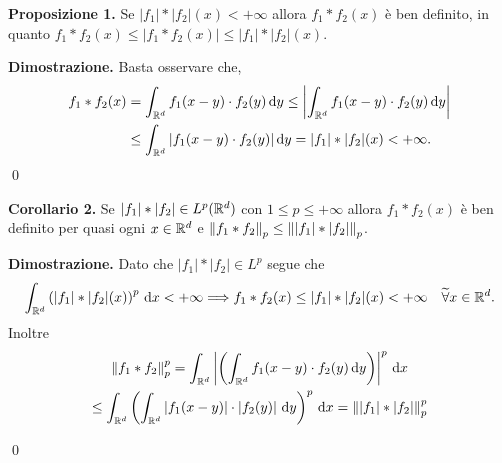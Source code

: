 %
%


\textbf{Proposizione 1.} Se $|f_1| \ast |f_2| (x) < +\infty$ allora $f_1 \ast f_2(x)$ è ben definito, in quanto $f_1 \ast f_2(x) \leq |f_1 \ast f_2(x)| \leq |f_1| \ast |f_2|(x)$.

\textbf{Dimostrazione.} Basta osservare che,
%
\begin{align*}
	f_1 \ast f_2(x) & = \int_{\mathbb R^d} f_1(x-y) \cdot f_2(y) \,\mathrm{d} y 
	\leq \left| \int_{\mathbb R^d} f_1(x-y) \cdot f_2(y) \,\mathrm{d} y \right| \\
	& \leq \int_{\mathbb R^d} |f_1(x-y) \cdot f_2(y)| \,\mathrm{d} y
	= |f_1| \ast |f_2|(x) < +\infty.
\end{align*}
\qed

\textbf{Corollario 2.} Se $|f_1| \ast |f_2| \in L^p(\mathbb R^d)$ con $1 \leq p \leq +\infty$ allora $f_1 \ast f_2(x)$ è ben definito per quasi ogni $x \in \mathbb R^d$ e $\left\lVert f_1 \ast f_2 \right\rVert_p \leq \left\lVert |f_1| \ast |f_2| \right\rVert_p$.

\textbf{Dimostrazione.} Dato che $|f_1| \ast |f_2| \in L^p$ segue che
$$
	\int_{\mathbb R^d} \left( |f_1| \ast |f_2|(x) \right)^p \,\mathrm{d} x < +\infty
	\Longrightarrow f_1 \ast f_2(x) \leq |f_1| \ast |f_2|(x) < +\infty \quad \widetilde{\forall} x \in \mathbb R^d.
$$
Inoltre
\begin{multline*}
	\left\lVert f_1 \ast f_2 \right\rVert_p^p 
	= \int_{\mathbb R^d} \left| \left( \int_{\mathbb R^d} f_1(x-y) \cdot f_2(y) \,\mathrm{d} y \right) \right|^p \,\mathrm{d} x \\
	\leq \int_{\mathbb R^d} \left( \int_{\mathbb R^d} \left| f_1(x-y) \right| \cdot \left| f_2(y) \right| \,\mathrm{d} y \right)^p \,\mathrm{d} x
	= \left\lVert |f_1| \ast |f_2|  \right\rVert_p^p
\end{multline*}

\qed


